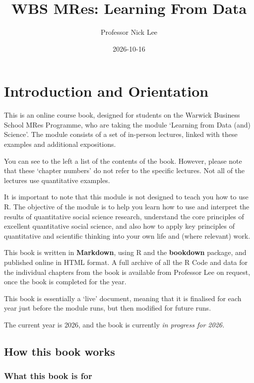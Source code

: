 \documentclass[
]{book}
\title{WBS MRes: Learning From Data}
\author{Professor Nick Lee}
\date{2026-10-16}
\begin{document}
\maketitle

{
\setcounter{tocdepth}{1}
\tableofcontents
}
\chapter{Introduction and Orientation}\label{introduction-and-orientation}

This is an online course book, designed for students on the Warwick Business School MRes Programme, who are taking the module `Learning from Data (and) Science'. The module consists of a set of in-person lectures, linked with these examples and additional expositions.

You can see to the left a list of the contents of the book. However, please note that these `chapter numbers' do not refer to the specific lectures. Not all of the lectures use quantitative examples.

It is important to note that this module is not designed to teach you how to use R. The objective of the module is to help you learn how to use and interpret the results of quantitative social science research, understand the core principles of excellent quantitative social science, and also how to apply key principles of quantitative and scientific thinking into your own life and (where relevant) work.

This book is written in \textbf{Markdown}, using R and the \textbf{bookdown} package, and published online in HTML format. A full archive of all the R Code and data for the individual chapters from the book is available from Professor Lee on request, once the book is completed for the year.

This book is essentially a `live' document, meaning that it is finalised for each year just before the module runs, but then modified for future runs.

The current year is 2026, and the book is currently \emph{in progress for 2026.}

\section{How this book works}\label{how-this-book-works}

\subsection{What this book is for}\label{what-this-book-is-for}
\end{document}
